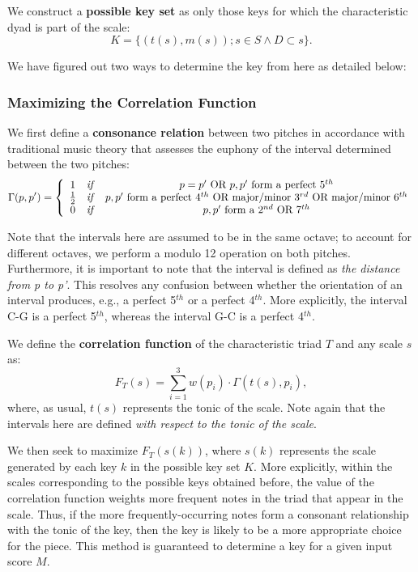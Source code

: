 \documentclass[11pt]{article}
\begin{document}
We construct a {\bf possible key set} as only those keys for which the characteristic dyad is part of the scale:
\[K= \{(t(s),m(s)); s\in S \wedge D\subset s\}.\]

We have figured out two ways to determine the key from here as detailed below:

\subsubsection{Maximizing the Correlation Function}
We first define a {\bf consonance relation} between two pitches in accordance with traditional music theory that assesses the euphony of the interval determined between the two pitches:
\begin{equation*}
\Gamma(p, p') = \left\{
\begin{array}{ccc}
1 & \text{\emph{if}} & p = p' \text{ OR } p, p' \text{ form a perfect } 5^{th} \\
\frac{1}{2} & \text{\emph{if}} & p, p' \text{ form a perfect } 4^{th} \text{ OR major/minor } 3^{rd} \text{ OR major/minor } 6^{th}\\
0 & \text{\emph{if}} & p, p' \text{ form a } 2^{nd} \text{ OR } 7^{th}\\
\end{array}
\right.
\end{equation*}

Note that the intervals here are assumed to be in the same octave; to account for different octaves, we perform a modulo 12 operation on both pitches. Furthermore, it is important to note that the interval is defined as {\em the distance from p to p'}. This resolves any confusion between whether the orientation of an interval produces, e.g., a perfect 5$^{th}$ or a perfect 4$^{th}$. More explicitly, the interval C-G is a perfect 5$^{th}$, whereas the interval G-C is a perfect 4$^{th}$.

We define the {\bf correlation function} of the characteristic triad $T$ and any scale $s$ as:
\[F_T(s) = \sum_{i=1}^3 w(p_i) \cdot \Gamma(t(s), p_i),\]
where, as usual, $t(s)$ represents the tonic of the scale. Note again that the intervals here are defined {\em with respect to the tonic of the scale}.

We then seek to maximize $F_T(s(k))$, where $s(k)$ represents the scale generated by each key $k$ in the possible key set $K$. More explicitly, within the scales corresponding to the possible keys obtained before, the value of the correlation function weights more frequent notes in the triad that appear in the scale. Thus, if the more frequently-occurring notes form a consonant relationship with the tonic of the key, then the key is likely to be a more appropriate choice for the piece. This method is guaranteed to determine a key for a given input score $M$.
\end{document}
